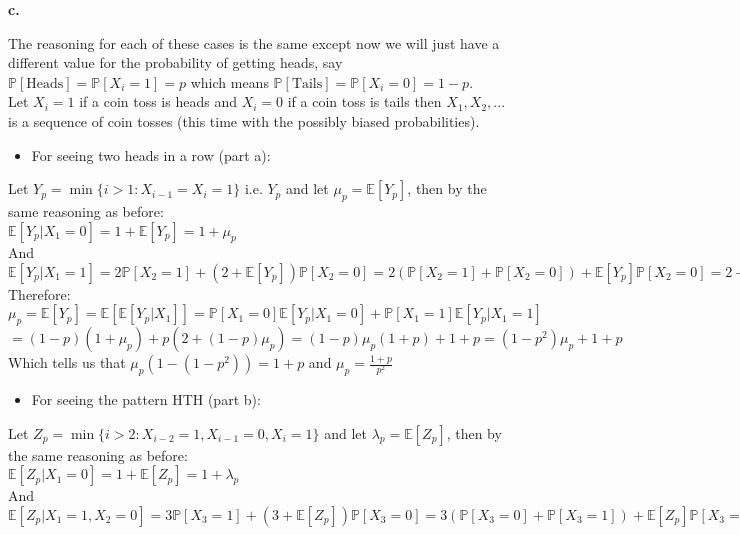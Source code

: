 \documentclass{article}
\begin{document}
\newpage
{\Large\textbf{c.}}
\begin{center}
\doublespacing
    The reasoning for each of these cases is the same except now we will just have a different value for the probability of getting heads, say $\mathbb{P}[\mbox{Heads}] =\mathbb{P}[X_i = 1] = p$ which means $\mathbb{P}[\mbox{Tails}] =\mathbb{P}[X_i = 0] = 1 - p$.
    \\Let $X_i = 1$ if a coin toss is heads and $X_i = 0$ if a coin toss is tails then $X_1, X_2, ...$ is a sequence of coin tosses (this time with the possibly biased probabilities).
    \break
    \begin{itemize}
        \item For seeing two heads in a row (part a):
    \end{itemize}
    Let $Y_p =\min\{i > 1 : X_{i-1} = X_i = 1\}$ i.e. $Y_p$ and let $\mu_p =\mathbb{E}[Y_p]$, then by the same reasoning as before:
    \\$\mathbb{E}[Y_p | X_1 = 0] = 1 +\mathbb{E}[Y_p] = 1 +\mu_p$
    \\And
    \\$\mathbb{E}[Y_p | X_1 = 1] = 2\mathbb{P}[X_2 = 1] + (2 +\mathbb{E}[Y_p])\mathbb{P}[X_2 = 0] = 2(\mathbb{P}[X_2 = 1] +\mathbb{P}[X_2 = 0]) +\mathbb{E}[Y_p]\mathbb{P}[X_2 = 0] = 2 + (1 - p)\mu_p$
    \\Therefore:
    \\$\mu_p =\mathbb{E}[Y_p] =\mathbb{E}[\mathbb{E}[Y_p|X_1]] =\mathbb{P}[X_1 = 0]\mathbb{E}[Y_p|X_1 = 0] +\mathbb{P}[X_1 = 1]\mathbb{E}[Y_p|X_1 = 1]$
    \\$= (1 - p)(1 +\mu_p) + p(2 + (1 - p)\mu_p) = (1 - p)\mu_p (1 + p) + 1 + p = (1 - p^2)\mu_p + 1 + p$
    \\Which tells us that $\mu_p (1 - (1 - p^2)) = 1 + p$ and $\mu_p =\frac{1 + p}{p^2}$ \qedsymbol
    \break
    \begin{itemize}
        \item For seeing the pattern HTH (part b):
    \end{itemize}
    Let $Z_p =\min\{i > 2 : X_{i-2} = 1, X_{i-1} = 0, X_i = 1\}$ and let $\lambda_p =\mathbb{E}[Z_p]$, then by the same reasoning as before:
    \\$\mathbb{E}[Z_p | X_1 = 0] = 1 +\mathbb{E}[Z_p] = 1 +\lambda_p$
    \\And
    \\$\mathbb{E}[Z_p | X_1 = 1, X_2 = 0] = 3\mathbb{P}[X_3 = 1] + (3 +\mathbb{E}[Z_p])\mathbb{P}[X_3 = 0] = 3(\mathbb{P}[X_3 = 0] +\mathbb{P}[X_3 = 1]) +\mathbb{E}[Z_p]\mathbb{P}[X_3 = 0] = 3 + (1 - p)\lambda_p$

\end{center}
\end{document}

